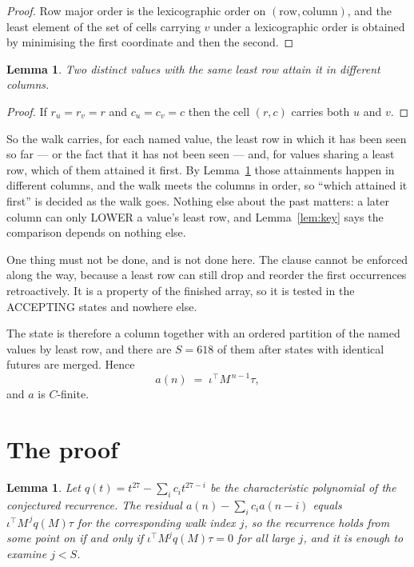 \documentclass[11pt,a4paper]{article}
\theoremstyle{plain}
\newtheorem{lemma}[theorem]{Lemma}
\theoremstyle{definition}
\begin{document}
\begin{proof}
Row major order is the lexicographic order on $(\text{row},\text{column})$, and the least
element of the set of cells carrying $v$ under a lexicographic order is obtained by minimising
the first coordinate and then the second.
\end{proof}

\begin{lemma}\label{lem:tie}
Two distinct values with the same least row attain it in different columns.
\end{lemma}

\begin{proof}
If $r_u=r_v=r$ and $c_u=c_v=c$ then the cell $(r,c)$ carries both $u$ and $v$.
\end{proof}

So the walk carries, for each named value, the least row in which it has been seen so far ---
or the fact that it has not been seen --- and, for values sharing a least row, which of them
attained it first. By Lemma~\ref{lem:tie} those attainments happen in different columns, and
the walk meets the columns in order, so ``which attained it first'' is decided as the walk
goes. Nothing else about the past matters: a later column can only LOWER a value's least row,
and Lemma~\ref{lem:key} says the comparison depends on nothing else.

One thing must not be done, and is not done here. The clause cannot be enforced along the way,
because a least row can still drop and reorder the first occurrences retroactively. It is a
property of the finished array, so it is tested in the ACCEPTING states and nowhere else.

The state is therefore a column together with an ordered partition of the named values by least
row, and there are $S=618$ of them after states with identical futures are merged. Hence
\[
a(n)\;=\;\iota^{\!\top}M^{\,n-1}\tau,
\]
and $a$ is $C$-finite.

\section{The proof}

\begin{lemma}\label{lem:crit}
Let $q(t)=t^{27}-\sum_i c_it^{27-i}$ be the characteristic polynomial of the
conjectured recurrence. The residual $a(n)-\sum_ic_ia(n-i)$ equals
$\iota^{\!\top}M^{\,j}q(M)\tau$ for the corresponding walk index $j$, so the recurrence
holds from some point on if and only if $\iota^{\!\top}M^{j}q(M)\tau=0$ for all large $j$,
and it is enough to examine $j<S$.
\end{lemma}
\end{document}
